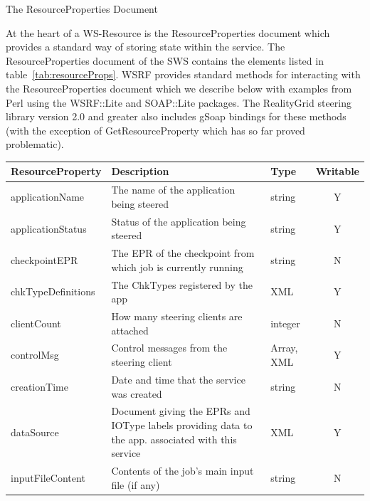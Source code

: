 \documentclass[a4paper]{article}
\begin{document}

\begin{section}{The ResourceProperties Document}
\label{sec:RPDoc}

At the heart of a WS-Resource is the ResourceProperties document which
provides a standard way of storing state within the service.  The
ResourceProperties document of the SWS contains the elements listed in
table~\ref{tab:resourceProps}.  WSRF provides standard methods for
interacting with the ResourceProperties document which we describe
below with examples from Perl using the WSRF::Lite and SOAP::Lite
packages.  The RealityGrid steering library version 2.0 and greater
also includes gSoap bindings for these methods (with the exception
of GetResourceProperty which has so far proved problematic).

\begin{table}
\begin{center}
\begin{tabular}{l|p{6cm}|l|c}
\hline\hline
ResourceProperty   & Description & Type & Writable\\
\hline
applicationName    & The name of the application being steered & string & Y\\
applicationStatus  & Status of the application being steered & string & Y\\
checkpointEPR      & The EPR of the checkpoint from which job is currently running & string & N\\
chkTypeDefinitions & The ChkTypes registered by the app & XML & Y\\
clientCount        & How many steering clients are attached & integer & N\\
controlMsg         & Control messages from the steering client & Array, XML & Y\\
creationTime       & Date and time that the service was created & string & N\\
dataSource         & Document giving the EPRs and IOType labels providing data to the app. associated with this service & XML & Y\\ 
inputFileContent   & Contents of the job's main input file (if any) & string & N\\


\end{tabular}
\end{center}
\end{table}
\end{section}
\end{document}
